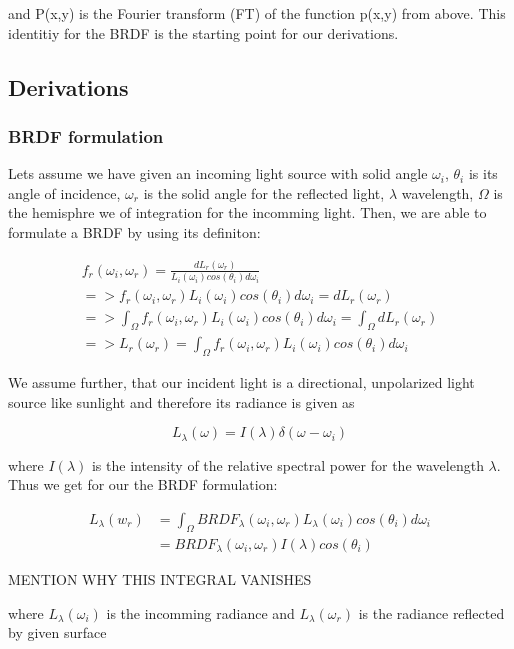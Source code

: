 and P(x,y) is the Fourier transform (FT) of the function p(x,y) from above.
This identitiy for the BRDF is the starting point for our derivations.


\subsection{Derivations}
\subsubsection{BRDF formulation}
Lets assume we have given an incoming light source with solid angle $\omega_i$, $\theta{_i}$ is its angle of incidence, $\omega_r$ is the solid angle for the reflected light, $\lambda$ wavelength, $\Omega$ is the hemisphre we of integration for the incomming light. Then, we are able to formulate a BRDF by using its definiton:  

\begin{align*}
f_r(\omega_i, \omega_r) = \frac{dL_r(\omega_r)}{L_i(\omega_i)cos(\theta_i)d\omega_i} \\
=> f_r(\omega_i, \omega_r) L_i(\omega_i)cos(\theta_i)d\omega_i = dL_r(\omega_r) \\
=> \int_{\Omega}f_r(\omega_i, \omega_r) L_i(\omega_i)cos(\theta_i)d\omega_i = \int_{\Omega}dL_r(\omega_r) \\
=> L_r(\omega_r) = \int_{\Omega}f_r(\omega_i, \omega_r) L_i(\omega_i)cos(\theta_i)d\omega_i
\end{align*}

We assume further, that our incident light is a directional, unpolarized light source like sunlight and therefore its radiance is given as 

\begin{equation}
 L_{\lambda}(\omega)=I(\lambda)\delta(\omega-\omega_i)
\end{equation}

where $I(\lambda)$ is the intensity of the relative spectral power for the wavelength $\lambda$. Thus we get for our the BRDF formulation:

\begin{align}
L_{\lambda}(w_r) 
& = \int_{\Omega} BRDF_{\lambda}(\omega_i, \omega_r) L_{\lambda}(\omega_i) cos(\theta_i) d\omega_i \\
& = BRDF_{\lambda}(\omega_i, \omega_r) I(\lambda) cos(\theta_i)
\end{align}

MENTION WHY THIS INTEGRAL VANISHES

where $L_{\lambda}(\omega_i)$ is the incomming radiance and $L_{\lambda}(\omega_r)$ is the radiance reflected by given surface

